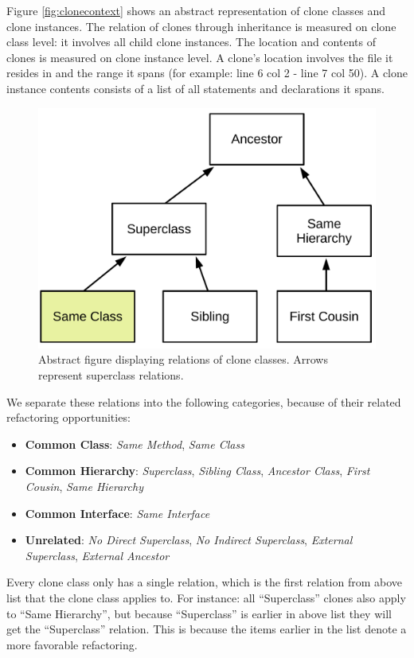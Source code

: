 Figure \ref{fig:clonecontext} shows an abstract representation of clone classes and clone instances. The relation of clones through inheritance is measured on clone class level: it involves all child clone instances. The location and contents of clones is measured on clone instance level. A clone's location involves the file it resides in and the range it spans (for example: line 6 col 2 - line 7 col 50). A clone instance contents consists of a list of all statements and declarations it spans.

\begin{figure}[H]
  \centering
    \includegraphics[width=0.6\columnwidth]{img/Relation}
      \caption{Abstract figure displaying relations of clone classes. Arrows represent superclass relations.}
  \label{fig:clonerelation}
\end{figure}

We separate these relations into the following categories, because of their related refactoring opportunities:
\begin{itemize}
  \item \textbf{Common Class}: \textit{Same Method}, \textit{Same Class}
  \item \textbf{Common Hierarchy}: \textit{Superclass}, \textit{Sibling Class}, \textit{Ancestor Class}, \textit{First Cousin}, \textit{Same Hierarchy}
  \item \textbf{Common Interface}: \textit{Same Interface}
  \item \textbf{Unrelated}: \textit{No Direct Superclass}, \textit{No Indirect Superclass}, \textit{External Superclass}, \textit{External Ancestor}
\end{itemize}

Every clone class only has a single relation, which is the first relation from above list that the clone class applies to. For instance: all ``Superclass'' clones also apply to ``Same Hierarchy'', but because ``Superclass'' is earlier in above list they will get the ``Superclass'' relation. This is because the items earlier in the list denote a more favorable refactoring.

